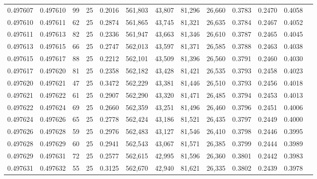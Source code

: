 \begin{tabular}{rrrrrrrrrrrrr}
0.497607 & 0.497610 &    99 &  25 &                                     0.2016 & 561,803 &  43,807 &  81,296 &  26,660 & 0.3783 & 0.2470 & 0.4058 \\
0.497610 & 0.497611 &    62 &  25 &                                     0.2874 & 561,865 &  43,745 &  81,321 &  26,635 & 0.3784 & 0.2467 & 0.4052 \\
0.497611 & 0.497613 &    82 &  25 &                                     0.2336 & 561,947 &  43,663 &  81,346 &  26,610 & 0.3787 & 0.2465 & 0.4045 \\
0.497613 & 0.497615 &    66 &  25 &                                     0.2747 & 562,013 &  43,597 &  81,371 &  26,585 & 0.3788 & 0.2463 & 0.4038 \\
0.497615 & 0.497617 &    88 &  25 &                                     0.2212 & 562,101 &  43,509 &  81,396 &  26,560 & 0.3791 & 0.2460 & 0.4030 \\
0.497617 & 0.497620 &    81 &  25 &                                     0.2358 & 562,182 &  43,428 &  81,421 &  26,535 & 0.3793 & 0.2458 & 0.4023 \\
0.497620 & 0.497621 &    47 &  25 &                                     0.3472 & 562,229 &  43,381 &  81,446 &  26,510 & 0.3793 & 0.2456 & 0.4018 \\
0.497621 & 0.497622 &    61 &  25 &                                     0.2907 & 562,290 &  43,320 &  81,471 &  26,485 & 0.3794 & 0.2453 & 0.4013 \\
0.497622 & 0.497624 &    69 &  25 &                                     0.2660 & 562,359 &  43,251 &  81,496 &  26,460 & 0.3796 & 0.2451 & 0.4006 \\
0.497624 & 0.497626 &    65 &  25 &                                     0.2778 & 562,424 &  43,186 &  81,521 &  26,435 & 0.3797 & 0.2449 & 0.4000 \\
0.497626 & 0.497628 &    59 &  25 &                                     0.2976 & 562,483 &  43,127 &  81,546 &  26,410 & 0.3798 & 0.2446 & 0.3995 \\
0.497628 & 0.497629 &    60 &  25 &                                     0.2941 & 562,543 &  43,067 &  81,571 &  26,385 & 0.3799 & 0.2444 & 0.3989 \\
0.497629 & 0.497631 &    72 &  25 &                                     0.2577 & 562,615 &  42,995 &  81,596 &  26,360 & 0.3801 & 0.2442 & 0.3983 \\
0.497631 & 0.497632 &    55 &  25 &                                     0.3125 & 562,670 &  42,940 &  81,621 &  26,335 & 0.3802 & 0.2439 & 0.3978 \\

\end{tabular}
